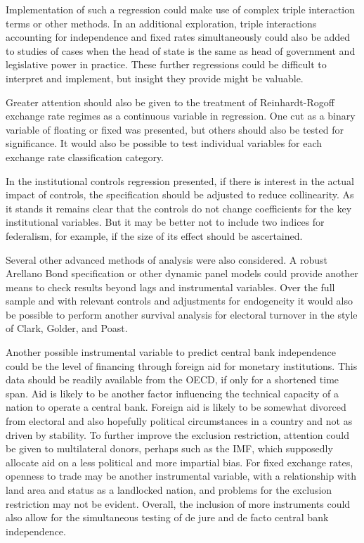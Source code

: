 \documentclass{article}
\begin{document}
    Implementation of such a regression could make use of complex triple interaction terms or other methods. In an additional exploration, triple interactions accounting for independence and fixed rates simultaneously could also be added to studies of cases when the head of state is the same as head of government and legislative power in practice. These further regressions could be difficult to interpret and implement, but insight they provide might be valuable.

    Greater attention should also be given to the treatment of Reinhardt-Rogoff exchange rate regimes as a continuous variable in regression. One cut as a binary variable of floating or fixed was presented, but others should also be tested for significance. It would also be possible to test individual variables for each exchange rate classification category.
    
    In the institutional controls regression presented, if there is interest in the actual impact of controls, the specification should be adjusted to reduce collinearity. As it stands it remains clear that the controls do not change coefficients for the key institutional variables. But it may be better not to include two indices for federalism, for example, if the size of its effect should be ascertained.

    Several other advanced methods of analysis were also considered. A robust Arellano Bond specification or other dynamic panel models could provide another means to check results beyond lags and instrumental variables. Over the full sample and with relevant controls and adjustments for endogeneity it would also be possible to perform another survival analysis for electoral turnover in the style of Clark, Golder, and Poast.

    Another possible instrumental variable to predict central bank independence could be the level of financing through foreign aid for monetary institutions. This data should be readily available from the OECD, if only for a shortened time span. Aid is likely to be another factor influencing the technical capacity of a nation to operate a central bank. Foreign aid is likely to be somewhat divorced from electoral and also hopefully political circumstances in a country and not as driven by stability. To further improve the exclusion restriction, attention could be given to multilateral donors, perhaps such as the IMF, which supposedly allocate aid on a less political and more impartial bias. For fixed exchange rates, openness to trade may be another instrumental variable, with a relationship with land area and status as a landlocked nation, and problems for the exclusion restriction may not be evident. Overall, the inclusion of more instruments could also allow for the simultaneous testing of de jure and de facto central bank independence.
\end{document}
